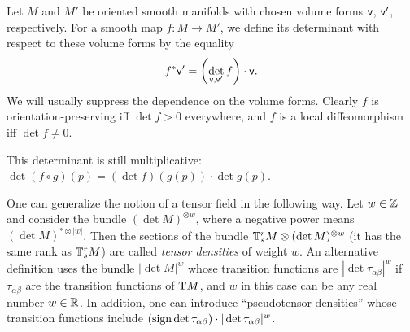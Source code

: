 \begin{defn}
Let $M$ and $M'$ be oriented smooth manifolds with chosen volume forms $\mathsf{v}$, $\mathsf{v}'$, respectively. For a smooth map $f:M\to M'$, we define its determinant with respect to these volume forms by the equality
\[f^\ast \mathsf{v}'=\left(\det_{\mathsf{v},\mathsf{v}'}f\right)\cdot \mathsf{v}.\]
We will usually suppress the dependence on the volume forms. Clearly $f$ is orientation-preserving iff $\det f>0$ everywhere, and $f$ is a local diffeomorphism iff $\det f\neq 0$.

This determinant is still multiplicative: $\det(f\circ g)(p)=(\det f)(g(p))\cdot \det g(p)$.
\end{defn}

\begin{defn}\label{def tensor densities}
One can generalize the notion of a tensor field in the following way. Let $w\in\mathbb{Z}$ and consider the bundle $(\det M)^{\otimes w}$, where a negative power means $(\det M)^{\ast\otimes |w|}$. Then the sections of the bundle $\mathbb{T}^r_s M\otimes (\det M)^{\otimes w}$ (it has the same rank as $\mathbb{T}^r_s M$) are called \emph{tensor densities} of weight $w$. An alternative definition uses the bundle $\left|\det M\right|^{w}$ whose transition functions are $|\det\tau_{\alpha\beta}|^w$ if $\tau_{\alpha\beta}$ are the transition functions of $\mathrm{T} M$, and $w$ in this case can be any real number $w\in\mathbb{R} $. In addition, one can introduce ``pseudotensor densities'' whose transition functions include $(\operatorname{sign}\det\tau_{\alpha\beta})\cdot |\det\tau_{\alpha\beta}|^w$.
\end{defn}

